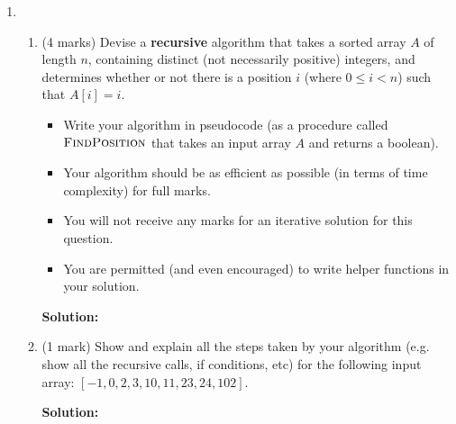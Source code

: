 \documentclass[a4,13pt]{extarticle}
\newenvironment{Solution}{\color{blue}\textbf{Solution:}}{}
\begin{document}
\begin{enumerate}
	\item 
	      \begin{enumerate}
	      	\item (4 marks) Devise a \textbf{recursive} algorithm that takes a sorted array $A$ of length $n$, containing distinct (not necessarily positive) integers, and determines whether or not there is a position $i$ (where $0\leq i < n$) such that $A[i] = i$.
	      	      \begin{itemize}
	      	      	\item Write your algorithm in pseudocode (as a procedure called $\textsc{FindPosition}$ that takes an input array $A$ and returns a boolean).
	      	      	\item Your algorithm should be as efficient as possible (in terms of time complexity) for full marks.
	      	      	\item You will not receive any marks for an iterative solution for this question. 
	      	      	\item You are permitted (and even encouraged) to write helper functions in your solution.
	      	      \end{itemize}
	      	      
	      	\begin{Solution}
	      	    
	      	\end{Solution}
	      	
	      	\item (1 mark) Show and explain all the steps taken by your algorithm (e.g. show all the recursive calls, if conditions, etc) for the following input array: $[-1,0,2,3,10,11,23,24,102]$.
	      	
	      	\begin{Solution}
	      	
                
            
	      	\end{Solution}
	      	

\end{enumerate}
\end{enumerate}
\end{document}
